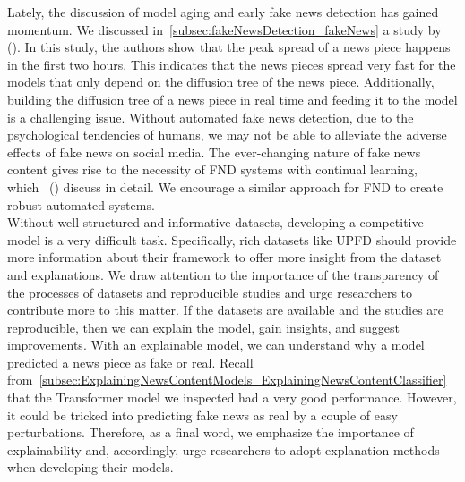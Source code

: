 Lately, the discussion of model aging and early fake news detection has gained momentum. We discussed in~\ref{subsec:fakeNewsDetection_fakeNews} a study by~\citeauthor{FakeNewsDetectionUsingGeometricDeepLearning_Monti} (\citeyear{FakeNewsDetectionUsingGeometricDeepLearning_Monti}). In this study, the authors show that the peak spread of a news piece happens in the first two hours. This indicates that the news pieces spread very fast for the models that only depend on the diffusion tree of the news piece. Additionally, building the diffusion tree of a news piece in real time and feeding it to the model is a challenging issue. Without automated fake news detection, due to the psychological tendencies of humans, we may not be able to alleviate the adverse effects of fake news on social media. The ever-changing nature of fake news content gives rise to the necessity of FND systems with continual learning, which~\citeauthor{GraphNeuralNetworksWithContinualLearningFakeNewsDetection_Han} (\citeyear{GraphNeuralNetworksWithContinualLearningFakeNewsDetection_Han}) discuss in detail. We encourage a similar approach for FND to create robust automated systems.\\
Without well-structured and informative datasets, developing a competitive model is a very difficult task. Specifically, rich datasets like UPFD should provide more information about their framework to offer more insight from the dataset and explanations. We draw attention to the importance of the transparency of the processes of datasets and reproducible studies and urge researchers to contribute more to this matter. If the datasets are available and the studies are reproducible, then we can explain the model, gain insights, and suggest improvements. With an explainable model, we can understand why a model predicted a news piece as fake or real. Recall from~\ref{subsec:ExplainingNewsContentModels_ExplainingNewsContentClassifier} that the Transformer model we inspected had a very good performance. However, it could be tricked into predicting fake news as real by a couple of easy perturbations. Therefore, as a final word, we emphasize the importance of explainability and, accordingly, urge researchers to adopt explanation methods when developing their models.